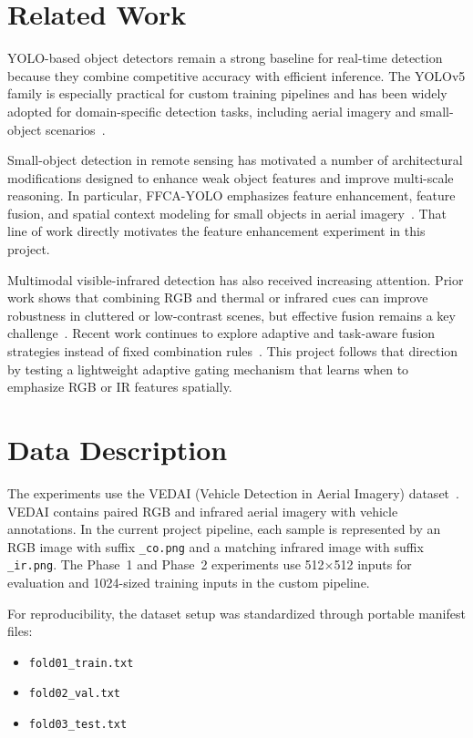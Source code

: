 \documentclass[sigconf,nonacm]{acmart}
\begin{document}
\section{Related Work}
YOLO-based object detectors remain a strong baseline for real-time detection because they combine competitive accuracy with efficient inference. The YOLOv5 family is especially practical for custom training pipelines and has been widely adopted for domain-specific detection tasks, including aerial imagery and small-object scenarios~\cite{yolov5}.

Small-object detection in remote sensing has motivated a number of architectural modifications designed to enhance weak object features and improve multi-scale reasoning. In particular, FFCA-YOLO emphasizes feature enhancement, feature fusion, and spatial context modeling for small objects in aerial imagery~\cite{ffcayolo}. That line of work directly motivates the feature enhancement experiment in this project.

Multimodal visible-infrared detection has also received increasing attention. Prior work shows that combining RGB and thermal or infrared cues can improve robustness in cluttered or low-contrast scenes, but effective fusion remains a key challenge~\cite{oafa2024,esm2024}. Recent work continues to explore adaptive and task-aware fusion strategies instead of fixed combination rules~\cite{tafyolo2025}. This project follows that direction by testing a lightweight adaptive gating mechanism that learns when to emphasize RGB or IR features spatially.

\section{Data Description}
The experiments use the VEDAI (Vehicle Detection in Aerial Imagery) dataset~\cite{vedai}. VEDAI contains paired RGB and infrared aerial imagery with vehicle annotations. In the current project pipeline, each sample is represented by an RGB image with suffix \texttt{\_co.png} and a matching infrared image with suffix \texttt{\_ir.png}. The Phase~1 and Phase~2 experiments use 512$\times$512 inputs for evaluation and 1024-sized training inputs in the custom pipeline.

For reproducibility, the dataset setup was standardized through portable manifest files:
\begin{itemize}[leftmargin=*]
    \item \texttt{fold01\_train.txt}
    \item \texttt{fold02\_val.txt}
    \item \texttt{fold03\_test.txt}
\end{itemize}
\end{document}
